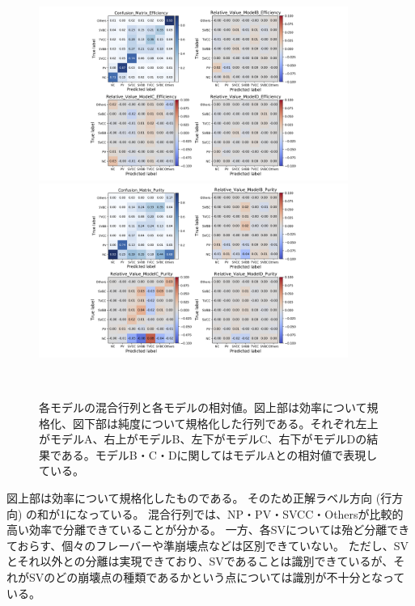 \begin{figure}[htbp]
 \centering
  \begin{minipage}{1.0\textwidth}
   \centering
    \includegraphics[trim = 300 0 300 0, width=0.9\textwidth, clip]{Figure/3Networks/3-3-3-2ConfusionMatrix_1.png}
   \end{minipage}
   
   \begin{minipage}{1.0\textwidth}
   \centering
    \includegraphics[trim = 300 0 300 0, width=0.9\textwidth, clip]{Figure/3Networks/3-3-3-2ConfusionMatrix_2.png}
   \end{minipage}
  \caption[各モデルの混合行列と各モデルの相対値]{各モデルの混合行列と各モデルの相対値。図上部は効率について規格化、図下部は純度について規格化した行列である。それぞれ左上がモデルA、右上がモデルB、左下がモデルC、右下がモデルDの結果である。モデルB・C・Dに関してはモデルAとの相対値で表現している。}
  \label{3-3-3-2ConfusionMatrix}
\end{figure}

図上部は効率について規格化したものである。
そのため正解ラベル方向 (行方向) の和が1になっている。
混合行列では、NP・PV・SVCC・Othersが比較的高い効率で分離できていることが分かる。
一方、各SVについては殆ど分離できておらす、個々のフレーバーや準崩壊点などは区別できていない。
ただし、SVとそれ以外との分離は実現できており、SVであることは識別できているが、それがSVのどの崩壊点の種類であるかという点については識別が不十分となっている。

